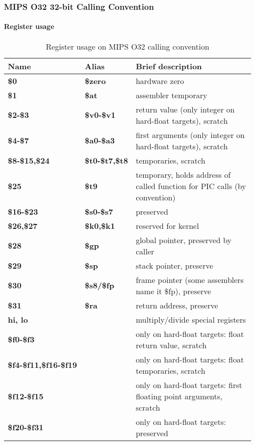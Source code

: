 \newpage


\subsubsection{MIPS O32 32-bit Calling Convention}

\paragraph{Register usage}

\begin{table}[h]
\begin{tabular*}{0.95\textwidth}{lll}
Name                         & Alias                & Brief description\\
\hline                                                             
{\bf \$0}                    & {\bf \$zero}         & hardware zero \\
{\bf \$1}                    & {\bf \$at}           & assembler temporary \\
{\bf \$2-\$3}                & {\bf \$v0-\$v1}      & return value (only integer on hard-float targets), scratch \\
{\bf \$4-\$7}                & {\bf \$a0-\$a3}      & first arguments (only integer on hard-float targets), scratch\\
{\bf \$8-\$15,\$24}          & {\bf \$t0-\$t7,\$t8} & temporaries, scratch \\
{\bf \$25}                   & {\bf \$t9}           & temporary, holds address of called function for PIC calls (by convention) \\
{\bf \$16-\$23}              & {\bf \$s0-\$s7}      & preserved \\
{\bf \$26,\$27}              & {\bf \$k0,\$k1}      & reserved for kernel \\
{\bf \$28}                   & {\bf \$gp}           & global pointer, preserved by caller \\
{\bf \$29}                   & {\bf \$sp}           & stack pointer, preserve \\
{\bf \$30}                   & {\bf \$s8/\$fp}      & frame pointer (some assemblers name it \$fp), preserve \\
{\bf \$31}                   & {\bf \$ra}           & return address, preserve \\
{\bf hi, lo}                 &                      & multiply/divide special registers \\
{\bf \$f0-\$f3}              &                      & only on hard-float targets: float return value, scratch \\
{\bf \$f4-\$f11,\$f16-\$f19} &                      & only on hard-float targets: float temporaries, scratch \\
{\bf \$f12-\$f15}            &                      & only on hard-float targets: first floating point arguments, scratch \\
{\bf \$f20-\$f31}            &                      & only on hard-float targets: preserved \\
\end{tabular*}
\caption{Register usage on MIPS O32 calling convention}
\end{table}

